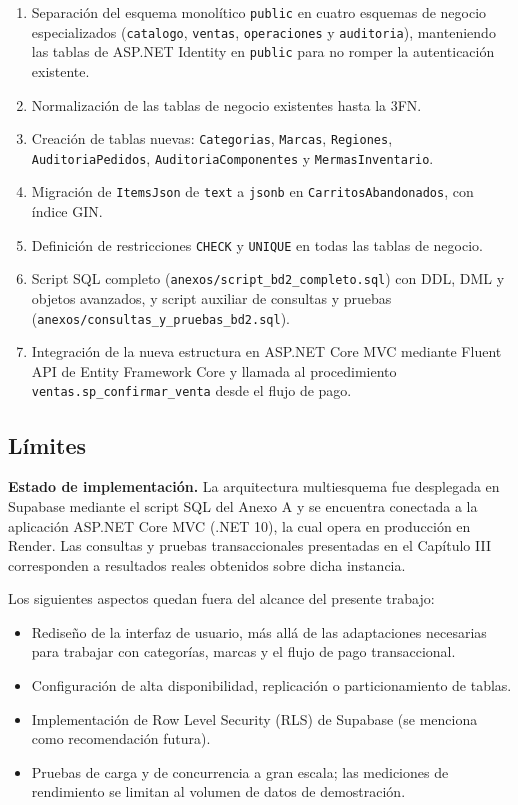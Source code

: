 \begin{enumerate}
  \item Separación del esquema monolítico \texttt{public} en cuatro esquemas de negocio especializados (\texttt{catalogo}, \texttt{ventas}, \texttt{operaciones} y \texttt{auditoria}), manteniendo las tablas de ASP.NET Identity en \texttt{public} para no romper la autenticación existente.
  \item Normalización de las tablas de negocio existentes hasta la 3FN.
  \item Creación de tablas nuevas: \texttt{Categorias}, \texttt{Marcas}, \texttt{Regiones}, \texttt{AuditoriaPedidos}, \texttt{AuditoriaComponentes} y \texttt{MermasInventario}.
  \item Migración de \texttt{ItemsJson} de \texttt{text} a \texttt{jsonb} en \texttt{CarritosAbandonados}, con índice GIN.
  \item Definición de restricciones \texttt{CHECK} y \texttt{UNIQUE} en todas las tablas de negocio.
  \item Script SQL completo (\texttt{anexos/script\_bd2\_completo.sql}) con DDL, DML y objetos avanzados, y script auxiliar de consultas y pruebas (\texttt{anexos/consultas\_y\_pruebas\_bd2.sql}).
  \item Integración de la nueva estructura en ASP.NET Core MVC mediante Fluent API de Entity Framework Core y llamada al procedimiento \texttt{ventas.sp\_confirmar\_venta} desde el flujo de pago.
\end{enumerate}

\subsection{Límites}

\textbf{Estado de implementación.} La arquitectura multiesquema fue desplegada en Supabase mediante el script SQL del Anexo A y se encuentra conectada a la aplicación ASP.NET Core MVC (.NET 10), la cual opera en producción en Render. Las consultas y pruebas transaccionales presentadas en el Capítulo III corresponden a resultados reales obtenidos sobre dicha instancia.

Los siguientes aspectos quedan fuera del alcance del presente trabajo:

\begin{itemize}
  \item Rediseño de la interfaz de usuario, más allá de las adaptaciones necesarias para trabajar con categorías, marcas y el flujo de pago transaccional.
  \item Configuración de alta disponibilidad, replicación o particionamiento de tablas.
  \item Implementación de Row Level Security (RLS) de Supabase (se menciona como recomendación futura).
  \item Pruebas de carga y de concurrencia a gran escala; las mediciones de rendimiento se limitan al volumen de datos de demostración.
\end{itemize}
